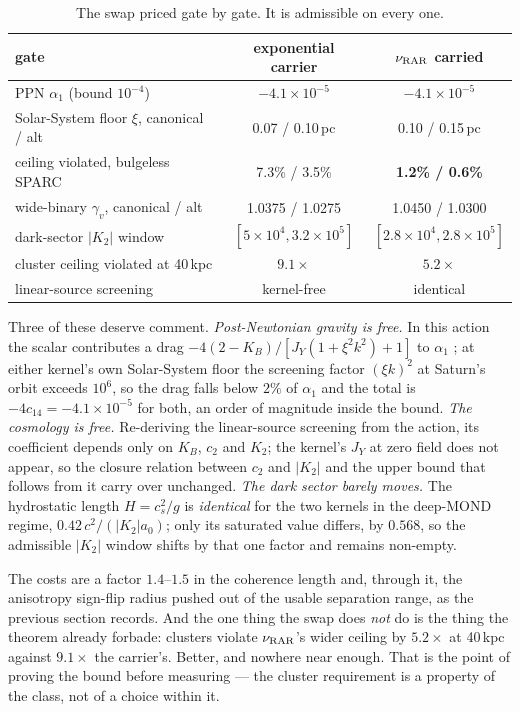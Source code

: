\documentclass[11pt,letterpaper]{article}
\begin{document}
\begin{table}[h]\centering
\begin{tabular}{lcc}\toprule
gate & exponential carrier & $\nu_{\rm RAR}$ carried\\\midrule
PPN $\alpha_1$ (bound $10^{-4}$) & $-4.1\times10^{-5}$ & $-4.1\times10^{-5}$\\
Solar-System floor $\xi$, canonical / alt & 0.07 / 0.10\,pc & 0.10 / 0.15\,pc\\
ceiling violated, bulgeless SPARC & 7.3\% / 3.5\% & \textbf{1.2\% / 0.6\%}\\
wide-binary $\gamma_v$, canonical / alt & 1.0375 / 1.0275 & 1.0450 / 1.0300\\
dark-sector $|K_2|$ window & $[5\times10^{4},3.2\times10^{5}]$ & $[2.8\times10^{4},2.8\times10^{5}]$\\
cluster ceiling violated at 40\,kpc & $9.1\times$ & $5.2\times$\\
linear-source screening & kernel-free & identical\\\bottomrule
\end{tabular}
\caption{The swap priced gate by gate. It is admissible on every one.}\label{tab:ladder}
\end{table}

Three of these deserve comment. \emph{Post-Newtonian gravity is free.} In this action the scalar contributes a drag $-4(2-K_B)/[J_Y(1+\xi^2k^2)+1]$ to $\alpha_1$ \cite{will14,jacobson01}; at either kernel's own Solar-System floor the screening factor $(\xi k)^2$ at Saturn's orbit exceeds $10^6$, so the drag falls below $2\%$ of $\alpha_1$ and the total is $-4c_{14}=-4.1\times10^{-5}$ for both, an order of magnitude inside the bound. \emph{The cosmology is free.} Re-deriving the linear-source screening from the action, its coefficient depends only on $K_B$, $c_2$ and $K_2$; the kernel's $J_Y$ at zero field does not appear, so the closure relation between $c_2$ and $|K_2|$ and the upper bound that follows from it carry over unchanged. \emph{The dark sector barely moves.} The hydrostatic length $H=c_s^2/g$ is \emph{identical} for the two kernels in the deep-MOND regime, $0.42\,c^2/(|K_2|a_0)$; only its saturated value differs, by $0.568$, so the admissible $|K_2|$ window shifts by that one factor and remains non-empty.

The costs are a factor $1.4$--$1.5$ in the coherence length and, through it, the anisotropy sign-flip radius pushed out of the usable separation range, as the previous section records. And the one thing the swap does \emph{not} do is the thing the theorem already forbade: clusters violate $\nu_{\rm RAR}$'s wider ceiling by $5.2\times$ at 40\,kpc against $9.1\times$ the carrier's. Better, and nowhere near enough. That is the point of proving the bound before measuring --- the cluster requirement is a property of the class, not of a choice within it.
\end{document}
